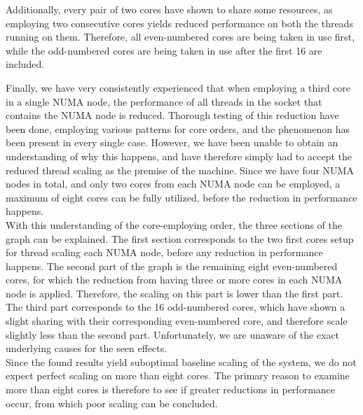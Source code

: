 \documentclass[11pt]{article} %
\begin{document}
Additionally, every pair of two cores have shown to share some resources, as employing two consecutive cores yields reduced performance on both the threads running on them. Therefore, all even-numbered cores are being taken in use first, while the odd-numbered cores are being taken in use after the first 16 are included.

Finally, we have very consistently experienced that when employing a third core in a single NUMA node, the performance of all threads in the socket that contains the NUMA node is reduced. Thorough testing of this reduction have been done, employing various patterns for core orders, and the phenomenon has been present in every single case. However, we have been unable to obtain an understanding of why this happens, and have therefore simply had to accept the reduced thread scaling as the premise of the machine. Since we have four NUMA nodes in total, and only two cores from each NUMA node can be employed, a maximum of eight cores can be fully utilized, before the reduction in performance happens.\\

With this understanding of the core-employing order, the three sections of the graph can be explained. The first section corresponds to the two first cores setup for thread scaling each NUMA node, before any reduction in performance happens. The second part of the graph is the remaining eight even-numbered cores, for which the reduction from having three or more cores in each NUMA node is applied. Therefore, the scaling on this part is lower than the first part. The third part corresponds to the 16 odd-numbered cores, which have shown a slight sharing with their corresponding even-numbered core, and therefore scale slightly less than the second part. Unfortunately, we are unaware of the exact underlying causes for the seen effects.\\

Since the found results yield suboptimal baseline scaling of the system, we do not expect perfect scaling on more than eight cores. The primary reason to examine more than eight cores is therefore to see if greater reductions in performance occur, from which poor scaling can be concluded.
\end{document}
